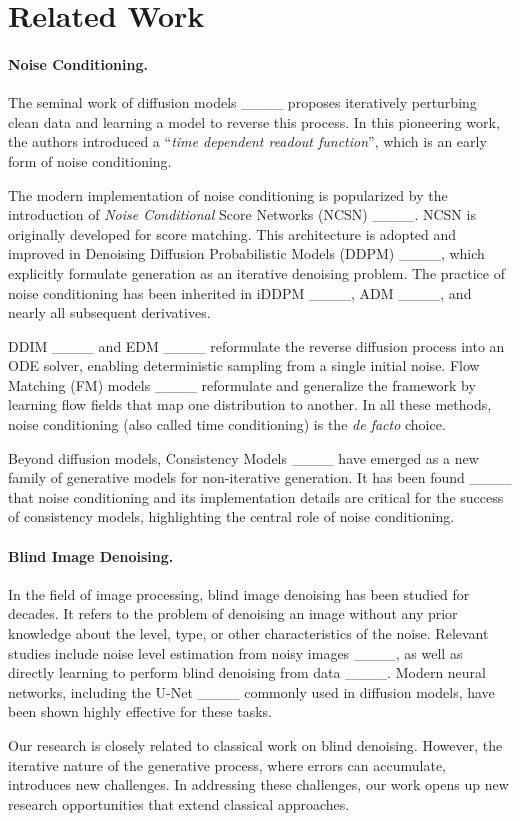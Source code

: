 \section{Related Work}
\label{sec:related}

\paragraph{Noise Conditioning.} The seminal work of diffusion models ____ proposes iteratively perturbing clean data and learning a model to reverse this process. In this pioneering work, the authors introduced a ``\textit{time dependent readout function}'', which is an early form of noise conditioning.

The modern implementation of noise conditioning is popularized by the introduction of \textit{Noise Conditional} Score Networks (NCSN) ____. NCSN is originally developed for score matching.
This architecture is adopted and improved in Denoising Diffusion Probabilistic Models (DDPM) ____, which explicitly formulate generation as an iterative denoising problem. The practice of noise conditioning has been inherited in iDDPM ____, ADM ____, and nearly all subsequent derivatives.

DDIM ____ and EDM ____ reformulate the reverse diffusion process into an ODE solver, enabling deterministic sampling from a single initial noise. Flow Matching (FM) models ____ reformulate and generalize the framework by learning flow fields that map one distribution to another. In all these methods, noise conditioning (also called time conditioning) is the \textit{de facto} choice.

Beyond diffusion models, Consistency Models ____ have emerged as a new family of generative models for non-iterative generation. It has been found ____ that noise conditioning and its implementation details are critical for the success of consistency models, highlighting the central role of noise conditioning.


\paragraph{Blind Image Denoising.} In the field of image processing, blind image denoising has been studied for decades. It refers to the problem of denoising an image without any prior knowledge about the level, type, or other characteristics of the noise. Relevant studies include noise level estimation from noisy images ____, as well as directly learning to perform blind denoising from data ____. Modern neural networks, including the \mbox{U-Net} ____ commonly used in diffusion models, have been shown highly effective for these tasks.

Our research is closely related to classical work on blind denoising. However, the iterative nature of the generative process, where errors can accumulate, introduces new challenges. In addressing these challenges, our work opens up new research opportunities that extend classical approaches.